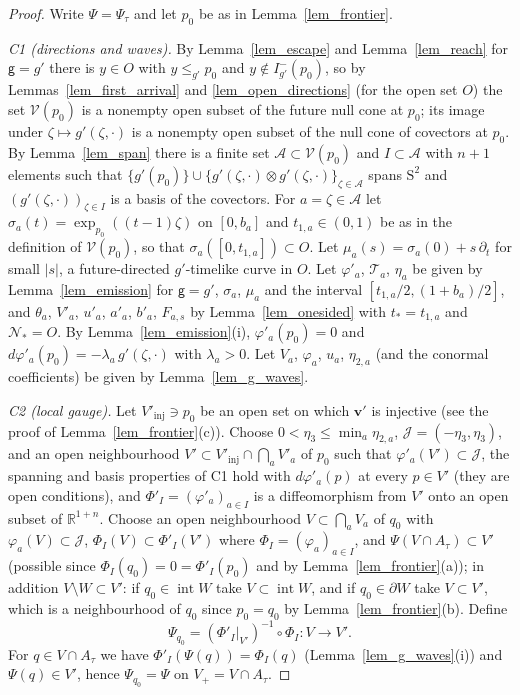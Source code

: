 \documentclass[11pt,a4paper,reqno]{amsart}
\theoremstyle{definition}
\numberwithin{equation}{section}
\newcommand{\R}{\mathbb{R}}
\newcommand{\cA}{\mathcal{A}}
\newcommand{\cJ}{\mathcal{J}}
\newcommand{\cN}{\mathcal{N}}
\newcommand{\cT}{\mathcal{T}}
\newcommand{\cV}{\mathcal{V}}
\newcommand{\sg}{\mathsf{g}}
\newcommand{\Sym}{\mathrm{S}^2}
\newcommand{\inte}{\operatorname{int}}
\begin{document}
\begin{proof}
Write $\Psi=\Psi_\tau$ and let $p_0$ be as in Lemma~\ref{lem_frontier}.

\emph{C1 (directions and waves).} By Lemma~\ref{lem_escape} and Lemma~\ref{lem_reach} for $\sg=g'$ there is $y\in O$ with
$y\le_{g'}p_0$ and $y\notin I^-_{g'}(p_0)$, so by Lemmas~\ref{lem_first_arrival} and \ref{lem_open_directions} (for the
open set $O$) the set $\cV(p_0)$ is a nonempty open subset of the future null cone at $p_0$; its image under
$\zeta\mapsto g'(\zeta,\cdot)$ is a nonempty open subset of the null cone of covectors at $p_0$. By Lemma~\ref{lem_span}
there is a finite set $\cA\subset\cV(p_0)$ and $I\subset\cA$ with $n+1$ elements such that
$\{g'(p_0)\}\cup\{g'(\zeta,\cdot)\otimes g'(\zeta,\cdot)\}_{\zeta\in\cA}$ spans $\Sym$ and
$(g'(\zeta,\cdot))_{\zeta\in I}$ is a basis of the covectors. For $a=\zeta\in\cA$ let $\sigma_a(t)=\exp_{p_0}((t-1)\zeta)$
on $[0,b_a]$ and $t_{1,a}\in(0,1)$ be as in the definition of $\cV(p_0)$, so that $\sigma_a([0,t_{1,a}])\subset O$. Let
$\mu_a(s)=\sigma_a(0)+s\,\partial_t$ for small $|s|$, a future-directed $g'$-timelike curve in $O$. Let $\varphi'_a$,
$\cT_a$, $\eta_a$ be given by Lemma~\ref{lem_emission} for $\sg=g'$, $\sigma_a$, $\mu_a$ and the interval
$[t_{1,a}/2,(1+b_a)/2]$, and $\theta_a$, $V'_a$, $u'_a$, $a'_a$, $b'_a$, $F_{a,s}$ by Lemma~\ref{lem_onesided} with
$t_*=t_{1,a}$ and $\cN_*=O$. By Lemma~\ref{lem_emission}(i), $\varphi'_a(p_0)=0$ and
$d\varphi'_a(p_0)=-\lambda_a\,g'(\zeta,\cdot)$ with $\lambda_a>0$. Let $V_a$, $\varphi_a$, $u_a$, $\eta_{2,a}$ (and the
conormal coefficients) be given by Lemma~\ref{lem_g_waves}.

\emph{C2 (local gauge).} Let $V'_{\mathrm{inj}}\ni p_0$ be an open set on which $\mathbf v'$ is injective (see the proof of
Lemma~\ref{lem_frontier}(c)). Choose $0<\eta_3\le\min_a\eta_{2,a}$, $\cJ=(-\eta_3,\eta_3)$, and an open neighbourhood
$V'\subset V'_{\mathrm{inj}}\cap\bigcap_aV'_a$ of $p_0$ such that $\varphi'_a(V')\subset\cJ$, the spanning and basis
properties of C1 hold with $d\varphi'_a(p)$ at every $p\in V'$ (they are open conditions), and $\Phi'_I=(\varphi'_a)_{a\in I}$
is a diffeomorphism from $V'$ onto an open subset of $\R^{1+n}$. Choose an open neighbourhood $V\subset\bigcap_aV_a$ of
$q_0$ with $\varphi_a(V)\subset\cJ$, $\Phi_I(V)\subset\Phi'_I(V')$ where $\Phi_I=(\varphi_a)_{a\in I}$, and
$\Psi(V\cap A_\tau)\subset V'$ (possible since $\Phi_I(q_0)=0=\Phi'_I(p_0)$ and by Lemma~\ref{lem_frontier}(a)); in
addition $V\setminus W\subset V'$: if $q_0\in\inte W$ take $V\subset\inte W$, and if $q_0\in\partial W$ take
$V\subset V'$, which is a neighbourhood of $q_0$ since $p_0=q_0$ by Lemma~\ref{lem_frontier}(b). Define
\[
\Psi_{q_0}=(\Phi'_I|_{V'})^{-1}\circ\Phi_I\colon V\to V'.
\]
For $q\in V\cap A_\tau$ we have $\Phi'_I(\Psi(q))=\Phi_I(q)$ (Lemma~\ref{lem_g_waves}(i)) and $\Psi(q)\in V'$, hence
$\Psi_{q_0}=\Psi$ on $V_+=V\cap A_\tau$.


\end{proof}
\end{document}
